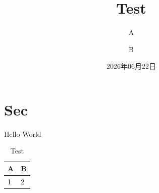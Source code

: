\documentclass[twocolumn,dark,nomath]{harryopo-paper}
\title{Test}
\author{A \and B}
\date{2026年06月22日}
\begin{document}
\maketitlewithabstract
\section{Sec}
Hello World
\begin{table}[htbp]
  \centering
  \caption{Test}
  \begin{tabular}{ll}
    \toprule
    A & B \\
    \midrule
    1 & 2 \\
    \bottomrule
  \end{tabular}
\end{table}
\end{document}
